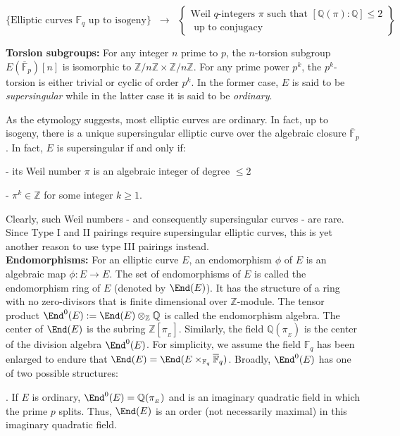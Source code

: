 \documentclass[a4paper, 11pt]{scrreprt}
\numberwithin{equation}{section}
\newcommand{\bz}{\mathbb Z}
\newcommand{\bq}{\mathbb Q}
\newcommand{\bFP}{\ov{\mathbb{F}}_p}
\newcommand{\bFq}{\mathbb{F}_q}
\newcommand{\bFQ}{\ov{\mathbb{F}}_q}
\newcommand{\lra}{\longrightarrow}
\newcommand{\ov}{\overline}
\newcommand{\noin}{\noindent}
\theoremstyle{plain}
\begin{document}
\[
  \{ \text{Elliptic curves } \bFq \text{ up to isogeny}  \} \;\;\lra\;\; \left\{\begin{array}{l}
    \text{Weil } q\text{-integers } \pi \text{ such that } [\bq(\pi):\bq]\leq 2 \\ 
     \text{ up to conjugacy} 
  \end{array}\right\}
\]

\noin \textbf{Torsion subgroups:} For any integer $n$ prime to $p$, the $n$-torsion subgroup $E(\bFP)[n]$ is isomorphic to $\bz/n\bz\times \bz/n\bz$. For any prime power $p^k$, the $p^k$-torsion is either trivial or cyclic of order $p^k$. In the former case, $E$ is said to be \textit{supersingular} while in the latter case it is said to be \textit{ordinary}. 

As the etymology suggests, most elliptic curves are ordinary. In fact, up to isogeny, there is a unique supersingular elliptic curve over the algebraic closure $\bFP$. In fact, $E$ is supersingular if and only if:

\noin - its Weil number $\pi$ is an algebraic integer of degree $\leq 2$  

\noin - $\pi^k\in \bz$ for some integer $k\geq 1$. 

Clearly, such Weil numbers - and consequently supersingular curves - are rare. Since Type I and II pairings require supersingular elliptic curves, this is yet another reason to use type III pairings instead. \\
  

\noin \textbf{Endomorphisms:} For an elliptic curve $E$, an endomorphism $\phi$ of $E$ is an algebraic map $\phi:E\lra E$. The set of endomorphisms of $E$ is called the endomorphism ring of $E$ (denoted by $\End(E)$). It has the structure of a ring with no zero-divisors that is finite dimensional over $\bz$-module. The tensor product $\End^0(E):= \End(E)\otimes_{\bz}\bq$ is called the endomorphism algebra. The center of $\End(E)$ is the subring $\bz[\pi_{_E}]$. Similarly, the field $\bq(\pi_{_E})$ is the center of the division algebra $\End^0(E)$. For simplicity, we assume the field $\bFq$ has been enlarged to endure that $\End(E) = \End(E\times_{\bFq} \bFQ)$. Broadly, $\End^0(E)$ has one of two possible structures:\vspace{1mm}

\noin 1. If $E$ is ordinary, $\End^0(E) = \bq(\pi_{_E})$ and is an imaginary quadratic field in which the prime $p$ splits. Thus, $\End(E)$ is an order (not necessarily maximal) in this imaginary quadratic field.
\end{document}
